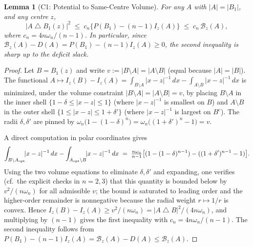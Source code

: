 \documentclass[11pt]{article}
\newtheorem{lemma}[theorem]{Lemma}
\newcommand{\B}{\mathcal{B}}
\begin{document}
\begin{lemma}[C1: Potential to Same-Centre Volume] \label{lem:C1}
For any $A$ with $|A|=|B_1|$, and any centre $z$,
\[
  |A \mathbin{\triangle} B_1(z)|^2 \;\le\; c_n \bigl\{ P(B_1) - (n-1)I_z(A) \bigr\} \;\le\; c_n \, \B_z(A),
\]
where $c_n = 4n\omega_n / (n-1)$. In particular, since $\B_z(A) - D(A) = P(B_1) - (n-1)I_z(A) \ge 0$, the second inequality is sharp up to the deficit slack.
\end{lemma}
\begin{proof}
Let $B = B_1(z)$ and write $v := |B \setminus A| = |A \setminus B|$ (equal because $|A|=|B|$). The functional $A \mapsto I_z(B) - I_z(A) = \int_{B \setminus A}|x-z|^{-1}\,dx - \int_{A \setminus B}|x-z|^{-1}\,dx$ is minimized, under the volume constraint $|B \setminus A| = |A \setminus B| = v$, by placing $B \setminus A$ in the inner shell $\{1-\delta \le |x-z| \le 1\}$ (where $|x-z|^{-1}$ is smallest on $B$) and $A \setminus B$ in the outer shell $\{1 \le |x-z| \le 1+\delta'\}$ (where $|x-z|^{-1}$ is largest on $B^c$). The radii $\delta, \delta'$ are pinned by $\omega_n\bigl(1-(1-\delta)^n\bigr) = \omega_n\bigl((1+\delta')^n-1\bigr) = v$.

A direct computation in polar coordinates gives
\[
\int_{B \setminus A_{\rm opt}}\!\!|x-z|^{-1}\,dx - \int_{A_{\rm opt}\setminus B}\!\!|x-z|^{-1}\,dx \;=\; \tfrac{n\omega_n}{n-1}\bigl[(1-(1-\delta)^{n-1}) - ((1+\delta')^{n-1}-1)\bigr].
\]
Using the two volume equations to eliminate $\delta, \delta'$ and expanding, one verifies (cf.\ the explicit checks in $n=2,3$) that this quantity is bounded below by $v^2/(n\omega_n)$ for all admissible $v$; the bound is saturated to leading order and the higher-order remainder is nonnegative because the radial weight $r \mapsto 1/r$ is convex. Hence $I_z(B) - I_z(A) \ge v^2/(n\omega_n) = |A \mathbin{\triangle} B|^2/(4n\omega_n)$, and multiplying by $(n-1)$ gives the first inequality with $c_n = 4n\omega_n/(n-1)$. The second inequality follows from $P(B_1) - (n-1)I_z(A) = \B_z(A) - D(A) \le \B_z(A)$.
\end{proof}
\end{document}
